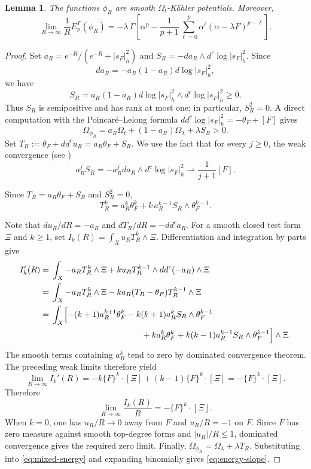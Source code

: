 \documentclass[reqno]{amsart}
\newcommand{\ddc}{dd^c}
\theoremstyle{plain}
\newtheorem{lemma}[thm]{Lemma}
\theoremstyle{remark}
\begin{document}
\begin{lemma}\label{lem:log-slope}
    The functions $\phi_R$ are smooth
$\Omega_t$-K\"ahler potentials.  Moreover,
\begin{equation}\label{eq:energy-slope}
 \lim_{R\to\infty}\frac1R E_p^\Gamma(\phi_R)
 =
 -\lambda\,\Gamma\left[
 \alpha^p-\frac1{p+1}\sum_{\ell=0}^{p}
 \alpha^\ell(\alpha-\lambda F)^{p-\ell}
 \right].
\end{equation}
\end{lemma}
\begin{proof}
Set $a_R=e^{-R}/(e^{-R}+|s_F|_h^2)$ and
$S_R=-da_R\wedge d^c\log|s_F|_h^2$. Since
\[
 da_R=-a_R(1-a_R)d\log|s_F|_h^2,
\]
we have
\[
 S_R=a_R(1-a_R)d\log|s_F|_h^2\wedge
 d^c\log|s_F|_h^2\geq0.
\]
Thus $S_R$ is semipositive and has rank at most one; in particular,
$S_R^2=0$. A direct computation with the Poincar\'e--Lelong formula
$\ddc\log|s_F|_h^2=-\theta_F+[F]$ gives
\[
 \Omega_{\phi_R}
 =a_R\Omega_t+(1-a_R)\Omega_{\lambda}
  +\lambda S_R>0.
\]
Set $T_R:=\theta_F+\ddc u_R=a_R\theta_F+S_R$. We use the fact that for every $j\geq0$,
the weak convergence (see \cite[proof of Lemma 9]{3d})
\[
a_R^jS_R=-a_R^jda_R\wedge d^c\log|s_F|_h^2
\rightharpoonup\frac{1}{j+1}[F].
\]

Since $T_R=a_R\theta_F+S_R$ and $S_R^2=0$,
\[
 T_R^k=a_R^k\theta_F^k
       +k\,a_R^{k-1}S_R\wedge\theta_F^{k-1}.
\]

Note that $d u_R/dR=-a_R$ and $dT_R/dR=-\ddc a_R$. For a smooth
closed test form $\Xi$ and $k\geq1$, set
$I_k(R)=\int_X u_R T_R^k\wedge\Xi$. Differentiation and integration by
parts give
\begin{align*}
I_k'(R)
={}&\int_X-a_RT_R^k\wedge\Xi
 +k u_RT_R^{k-1}\wedge\ddc(-a_R)\wedge\Xi\\
={}&\int_X-a_RT_R^k\wedge\Xi
 -k a_R(T_R-\theta_F)T_R^{k-1}\wedge\Xi\\
={}&\int_X\Bigl[-(k+1)a_R^{k+1}\theta_F^k
 -k(k+1)a_R^kS_R\wedge\theta_F^{k-1}\\
&\hspace{38mm}
 +k a_R^k\theta_F^k
 +k(k-1)a_R^{k-1}S_R\wedge\theta_F^{k-1}\Bigr]\wedge\Xi.
\end{align*}
The smooth terms containing $a_R^k$ tend to zero by dominated
convergence theorem. The preceding weak limits therefore yield
\[
 \lim_{R\to\infty}I_k'(R)
 =-k\{F\}^k\cdot[\Xi]
  +(k-1)\{F\}^k\cdot[\Xi]
 =-\{F\}^k\cdot[\Xi].
\]
Therefore
\[
 \lim_{R\to\infty}\frac{I_k(R)}R
 =-\{F\}^k\cdot[\Xi].
\]
When $k=0$, one has $u_R/R\to0$ away from $F$ and $u_R/R=-1$ on
$F$. Since $F$ has zero measure against smooth top-degree forms and
$|u_R|/R\leq1$, dominated convergence gives the required zero limit.
Finally, $\Omega_{\phi_R}=\Omega_{\lambda}+\lambda T_R$.
Substituting into \eqref{eq:mixed-energy} and expanding binomially
gives \eqref{eq:energy-slope}.
\end{proof}
\end{document}
